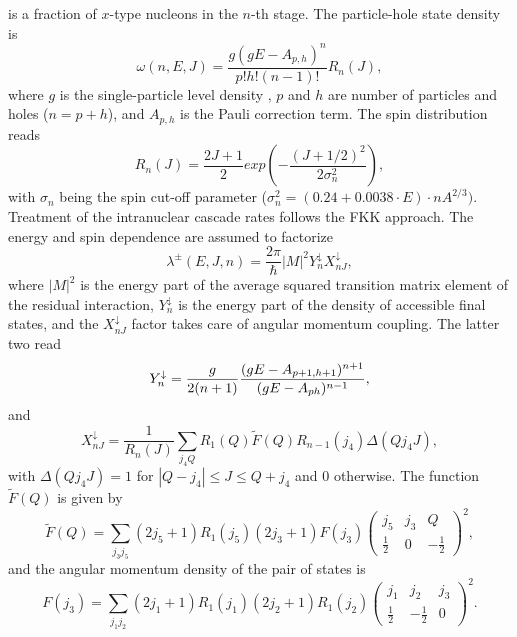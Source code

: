 is a fraction of $x$-type nucleons in the $n$-th stage. The particle-hole
state density is
\begin{equation}
\omega (n,E,J)=\frac{g(gE-A_{p,h})^{n}}{p!h!(n-1)!}R_{n}(J),
\end{equation}%
\noindent where $g$ is the single-particle level density%
, $p$ and $h$ are number of particles and holes ($%
n=p+h$), and $A_{p,h}$ is the Pauli correction term. The spin distribution
reads
\begin{equation}
R_{n}(J)=%
\frac{2J+1}{2}exp\left( -\frac{(J+1/2)^{2}}{2\sigma _{n}^{2}}\right) ,
\end{equation}%
with $\sigma _{n}$ being the spin cut-off parameter ($\sigma
_{n}^{2}=(0.24+0.0038\cdot E)\cdot nA^{2/3}).$ Treatment of the intranuclear
cascade rates follows the FKK \cite{FKK} approach. The energy and spin
dependence are assumed to factorize
\begin{equation}
\lambda ^{\pm }(E,J,n)=\frac{2\pi }{\hbar }|M|^{2}Y_{n}^{\downarrow
}X_{nJ}^{\downarrow },
\end{equation}%
\noindent where $|M|^{2}$ is the energy part of the average squared
transition matrix element of the residual interaction, $Y_{n}^{\downarrow }$
is the energy part of the density of accessible final states, and the $%
X_{nJ}^{\downarrow }$ factor takes care of angular momentum coupling. The
latter two read
\begin{equation}
Y_{n}^{\downarrow }=\frac{g}{2(n+1)}\frac{(gE-A_{p+1,h+1})^{n+1}}{%
(gE-A_{ph})^{n-1}},
\end{equation}%
and
\begin{equation}
X_{nJ}^{\downarrow }=\frac{1}{R_{n}(J)}\sum_{j_{4}Q}R_{1}(Q)\widetilde{F}%
(Q)R_{n-1}(j_{4})\Delta (Qj_{4}J),
\end{equation}%
with $\Delta (Qj_{4}J)=1$ for $|Q-j_{4}|\leq J\leq Q+j_{4}$ and 0 otherwise.
The function $\widetilde{F}(Q)$ is given by
\begin{equation}
\widetilde{F}(Q)=\sum_{j_{3}j_{5}}(2j_{5}+1)R_{1}(j_{5})(2j_{3}+1)F(j_{3})%
\left(
\begin{array}{ccc}
j_{5} & j_{3} & Q \\
\frac{1}{2} & 0 & -\frac{1}{2}%
\end{array}%
\right) ^{2},
\end{equation}%
and the angular momentum density of the pair of states is
\begin{equation}
F(j_{3})=\sum_{j_{1}j_{2}}(2j_{1}+1)R_{1}(j_{1})(2j_{2}+1)R_{1}(j_{2})\left(
\begin{array}{ccc}
j_{1} & j_{2} & j_{3} \\
\frac{1}{2} & -\frac{1}{2} & 0%
\end{array}%
\right) ^{2}.
\end{equation}%
